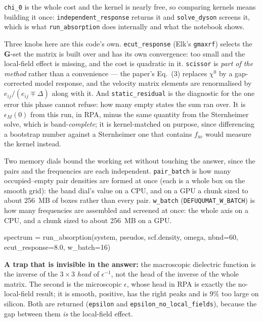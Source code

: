 \documentclass[11pt,a4paper]{article}
\newcommand{\code}[1]{\texttt{\small #1}}
\begin{document}
\code{chi\_0} is the whole cost and the kernel is nearly free, so comparing
kernels means building it once: \code{independent\_response} returns it and
\code{solve\_dyson} screens it, which is what \code{run\_absorption} does
internally and what the notebook shows.

Three knobs here are this code's own. \code{ecut\_response} (Elk's
\code{gmaxrf}) selects the $\mathbf G$-set the matrix is built over and has its
own convergence: too small and the local-field effect is missing, and the cost
is quadratic in it. \code{scissor} is \emph{part of the method} rather than a
convenience --- the paper's Eq.~(3) replaces $\chi^0$ by a gap-corrected model
response, and the velocity matrix elements are renormalised by
$e_{ij}/(e_{ij}\mp\Delta)$ along with it. And \code{static\_residual} is the
diagnostic for the one error this phase cannot refuse: how many empty states
the sum ran over. It is $\epsilon_M(0)$ from this run, in RPA, minus the same
quantity from the Sternheimer solve, which is band-\emph{complete}; it is
kernel-matched on purpose, since differencing a bootstrap number against a
Sternheimer one that contains $f_{\mathrm{xc}}$ would measure the kernel
instead.

Two memory dials bound the working set without touching the answer, since the
pairs and the frequencies are each independent. \code{pair\_batch} is how many
occupied--empty pair densities are formed at once (each is a whole box on the
smooth grid): the band dial's value on a CPU, and on a GPU a chunk sized to about
256~MB of boxes rather than every pair. \code{w\_batch}
(\code{DEFUQUMAT\_W\_BATCH}) is how many frequencies are assembled and screened at
once: the whole axis on a CPU, and a chunk sized to about 256~MB on a GPU.

\begin{pycode}
spectrum = run_absorption(system, pseudos, scf.density, omega,
                          nbnd=60, ecut_response=8.0, w_batch=16)
\end{pycode}

\textbf{A trap that is invisible in the answer:} the macroscopic dielectric
function is the inverse of the $3\times3$ \emph{head} of $\epsilon^{-1}$, not
the head of the inverse of the whole matrix. The second is the microscopic
$\epsilon$, whose head in RPA is exactly the no-local-field result; it is
smooth, positive, has the right peaks and is 9\% too large on silicon. Both are
returned (\code{epsilon} and \code{epsilon\_no\_local\_fields}), because the gap
between them \emph{is} the local-field effect.
\end{document}
